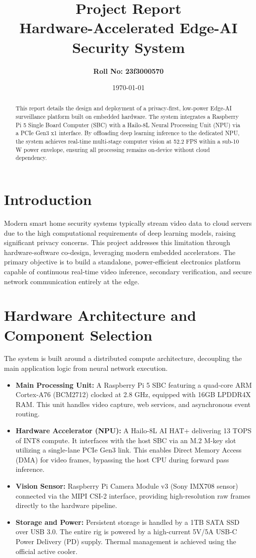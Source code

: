 \documentclass[a4paper,12pt]{article}
\title{\textbf{Project Report} \\ Hardware-Accelerated Edge-AI Security System}
\author{\textbf{Roll No: 23f3000570}}
\date{\today}
\begin{document}
\maketitle

\begin{abstract}
This report details the design and deployment of a privacy-first, low-power Edge-AI surveillance platform built on embedded hardware. The system integrates a Raspberry Pi 5 Single Board Computer (SBC) with a Hailo-8L Neural Processing Unit (NPU) via a PCIe Gen3 x1 interface. By offloading deep learning inference to the dedicated NPU, the system achieves real-time multi-stage computer vision at 52.2 FPS within a sub-10 W power envelope, ensuring all processing remains on-device without cloud dependency.
\end{abstract}

\section{Introduction}
Modern smart home security systems typically stream video data to cloud servers due to the high computational requirements of deep learning models, raising significant privacy concerns. This project addresses this limitation through hardware-software co-design, leveraging modern embedded accelerators. The primary objective is to build a standalone, power-efficient electronics platform capable of continuous real-time video inference, secondary verification, and secure network communication entirely at the edge.

\section{Hardware Architecture and Component Selection}
The system is built around a distributed compute architecture, decoupling the main application logic from neural network execution.

\begin{itemize}
    \item \textbf{Main Processing Unit:} A Raspberry Pi 5 SBC featuring a quad-core ARM Cortex-A76 (BCM2712) clocked at 2.8 GHz, equipped with 16GB LPDDR4X RAM. This unit handles video capture, web services, and asynchronous event routing.
    \item \textbf{Hardware Accelerator (NPU):} A Hailo-8L AI HAT+ delivering 13 TOPS of INT8 compute. It interfaces with the host SBC via an M.2 M-key slot utilizing a single-lane PCIe Gen3 link. This enables Direct Memory Access (DMA) for video frames, bypassing the host CPU during forward pass inference.
    \item \textbf{Vision Sensor:} Raspberry Pi Camera Module v3 (Sony IMX708 sensor) connected via the MIPI CSI-2 interface, providing high-resolution raw frames directly to the hardware pipeline.
    \item \textbf{Storage and Power:} Persistent storage is handled by a 1TB SATA SSD over USB 3.0. The entire rig is powered by a high-current 5V/5A USB-C Power Delivery (PD) supply. Thermal management is achieved using the official active cooler.
\end{itemize}
\end{document}
